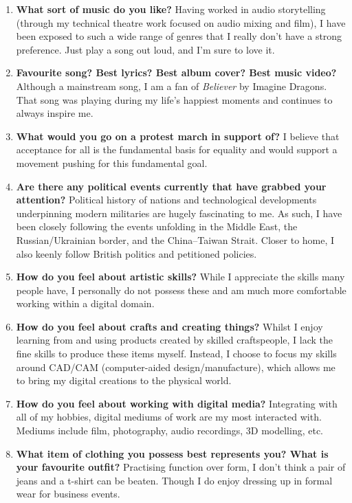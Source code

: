 \begin{enumerate}
    \item \textbf{What sort of music do you like?} Having worked in audio storytelling (through my technical theatre work focused on audio mixing and film), I have been exposed to such a wide range of genres that I really don't have a strong preference. Just play a song out loud, and I'm sure to love it.

    \item \textbf{Favourite song? Best lyrics? Best album cover? Best music video?} Although a mainstream song, I am a fan of \textit{Believer} by Imagine Dragons. That song was playing during my life's happiest moments and continues to always inspire me.

    \item \textbf{What would you go on a protest march in support of?} I believe that acceptance for all is the fundamental basis for equality and would support a movement pushing for this fundamental goal.

    \item \textbf{Are there any political events currently that have grabbed your attention?} Political history of nations and technological developments underpinning modern militaries are hugely fascinating to me. As such, I have been closely following the events unfolding in the Middle East, the Russian/Ukrainian border, and the China–Taiwan Strait. Closer to home, I also keenly follow British politics and petitioned policies.

    \item \textbf{How do you feel about artistic skills?} While I appreciate the skills many people have, I personally do not possess these and am much more comfortable working within a digital domain.

    \item \textbf{How do you feel about crafts and creating things?} Whilst I enjoy learning from and using products created by skilled craftspeople, I lack the fine skills to produce these items myself. Instead, I choose to focus my skills around CAD/CAM (computer-aided design/manufacture), which allows me to bring my digital creations to the physical world.

    \item \textbf{How do you feel about working with digital media?} Integrating with all of my hobbies, digital mediums of work are my most interacted with. Mediums include film, photography, audio recordings, 3D modelling, etc.

    \item \textbf{What item of clothing you possess best represents you? What is your favourite outfit?} Practising function over form, I don't think a pair of jeans and a t-shirt can be beaten. Though I do enjoy dressing up in formal wear for business events.


\end{enumerate}
